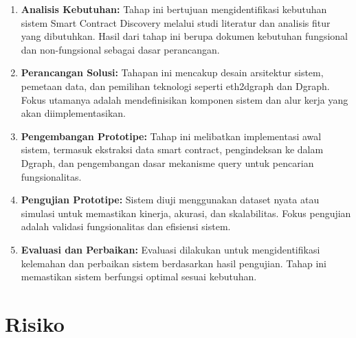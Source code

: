 \begin{enumerate}
  \item \textbf{Analisis Kebutuhan:} Tahap ini bertujuan mengidentifikasi kebutuhan sistem Smart Contract Discovery melalui studi literatur dan analisis fitur yang dibutuhkan. Hasil dari tahap ini berupa dokumen kebutuhan fungsional dan non-fungsional sebagai dasar perancangan. 
  \item \textbf{Perancangan Solusi:} Tahapan ini mencakup desain arsitektur sistem, pemetaan data, dan pemilihan teknologi seperti eth2dgraph dan Dgraph. Fokus utamanya adalah mendefinisikan komponen sistem dan alur kerja yang akan diimplementasikan.
  \item \textbf{Pengembangan Prototipe:} Tahap ini melibatkan implementasi awal sistem, termasuk ekstraksi data smart contract, pengindeksan ke dalam Dgraph, dan pengembangan dasar mekanisme query untuk pencarian fungsionalitas.
  \item \textbf{Pengujian Prototipe:} Sistem diuji menggunakan dataset nyata atau simulasi untuk memastikan kinerja, akurasi, dan skalabilitas. Fokus pengujian adalah validasi fungsionalitas dan efisiensi sistem.
  \item \textbf{Evaluasi dan Perbaikan:} Evaluasi dilakukan untuk mengidentifikasi kelemahan dan perbaikan sistem berdasarkan hasil pengujian. Tahap ini memastikan sistem berfungsi optimal sesuai kebutuhan.
\end{enumerate}

\section{Risiko}
\label{sec:risiko}



